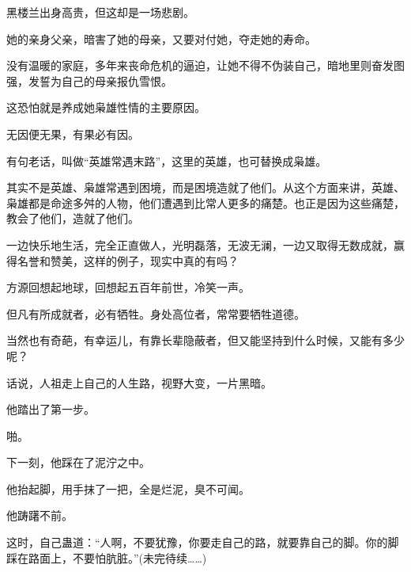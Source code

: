 \begin{this_body}
黑楼兰出身高贵，但这却是一场悲剧。

她的亲身父亲，暗害了她的母亲，又要对付她，夺走她的寿命。

没有温暖的家庭，多年来丧命危机的逼迫，让她不得不伪装自己，暗地里则奋发图强，发誓为自己的母亲报仇雪恨。

这恐怕就是养成她枭雄性情的主要原因。

无因便无果，有果必有因。

有句老话，叫做“英雄常遇末路”，这里的英雄，也可替换成枭雄。

其实不是英雄、枭雄常遇到困境，而是困境造就了他们。从这个方面来讲，英雄、枭雄都是命途多舛的人物，他们遭遇到比常人更多的痛楚。也正是因为这些痛楚，教会了他们，造就了他们。

一边快乐地生活，完全正直做人，光明磊落，无波无澜，一边又取得无数成就，赢得名誉和赞美，这样的例子，现实中真的有吗？

方源回想起地球，回想起五百年前世，冷笑一声。

但凡有所成就者，必有牺牲。身处高位者，常常要牺牲道德。

当然也有奇葩，有幸运儿，有靠长辈隐蔽者，但又能坚持到什么时候，又能有多少呢？

话说，人祖走上自己的人生路，视野大变，一片黑暗。

他踏出了第一步。

啪。

下一刻，他踩在了泥泞之中。

他抬起脚，用手抹了一把，全是烂泥，臭不可闻。

他踌躇不前。

这时，自己蛊道：“人啊，不要犹豫，你要走自己的路，就要靠自己的脚。你的脚踩在路面上，不要怕肮脏。”(未完待续……)

\end{this_body}


